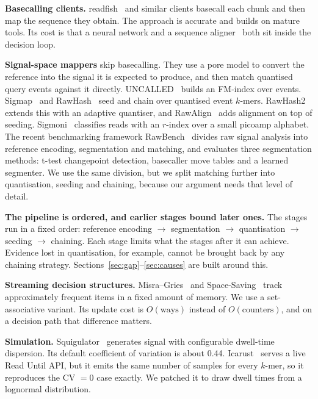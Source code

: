 \documentclass[conference]{IEEEtran}
\begin{document}
\textbf{Basecalling clients.} readfish~\cite{readfish} and similar clients basecall each chunk
and then map the sequence they obtain. The approach is accurate and builds on mature tools. Its
cost is that a neural network and a sequence aligner~\cite{minimap2} both sit inside the
decision loop.

\textbf{Signal-space mappers} skip basecalling. They use a pore model to convert the reference
into the signal it is expected to produce, and then match quantised query events against it
directly. UNCALLED~\cite{uncalled} builds an FM-index over events. Sigmap~\cite{sigmap} and
RawHash~\cite{rawhash} seed and chain over quantised event $k$-mers. RawHash2~\cite{rawhash2}
extends this with an adaptive quantiser, and RawAlign~\cite{rawalign} adds alignment on top of
seeding. Sigmoni~\cite{sigmoni} classifies reads with an $r$-index over a small picoamp
alphabet. The recent benchmarking framework RawBench~\cite{rawbench} divides raw signal
analysis into reference encoding, segmentation and matching, and evaluates three segmentation
methods: t-test changepoint detection, basecaller move tables and a learned segmenter. We use
the same division, but we split matching further into quantisation, seeding and chaining,
because our argument needs that level of detail.

\textbf{The pipeline is ordered, and earlier stages bound later ones.} The stages run in a fixed
order: reference encoding $\rightarrow$ segmentation $\rightarrow$ quantisation $\rightarrow$
seeding $\rightarrow$ chaining. Each stage limits what the stages after it can achieve. Evidence
lost in quantisation, for example, cannot be brought back by any chaining strategy.
Sections~\ref{sec:gap}--\ref{sec:causes} are built around this.

\textbf{Streaming decision structures.} Misra--Gries~\cite{misragries} and
Space-Saving~\cite{spacesaving} track approximately frequent items in a fixed amount of memory.
We use a set-associative variant. Its update cost is $O(\text{ways})$ instead of
$O(\text{counters})$, and on a decision path that difference matters.

\textbf{Simulation.} Squigulator~\cite{squigulator} generates signal with configurable
dwell-time dispersion. Its default coefficient of variation is about 0.44.
Icarust~\cite{icarust} serves a live Read Until API, but it emits the same number of samples
for every $k$-mer, so it reproduces the CV $= 0$ case exactly. We patched it to draw dwell times
from a lognormal distribution.
\end{document}
